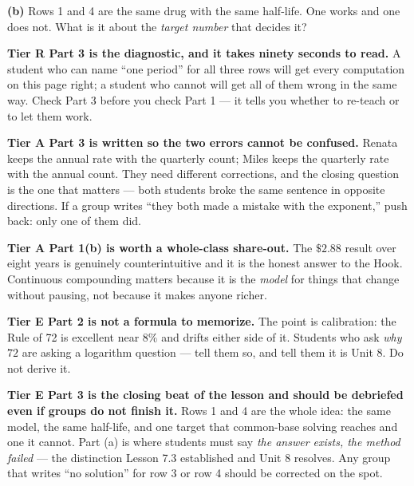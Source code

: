 \documentclass[10pt]{article}
\begin{document}
\begin{tcolorbox}[colback=white, colframe=black!40, title=\textbf{Tier E --- Extension},
    fonttitle=\bfseries, arc=1.5mm, left=3mm, right=3mm, top=2mm, bottom=2mm, breakable]
\vspace{2pt}
\textbf{(b)} Rows 1 and 4 are the same drug with the same half-life. One works and one does not. What
is it about the \emph{target number} that decides it?
\end{tcolorbox}

\begin{teachernote}
\textbf{Tier R Part 3 is the diagnostic, and it takes ninety seconds to read.} A student who can name
``one period'' for all three rows will get every computation on this page right; a student who cannot
will get all of them wrong in the same way. Check Part 3 before you check Part 1 --- it tells you
whether to re-teach or to let them work.

\textbf{Tier A Part 3 is written so the two errors cannot be confused.} Renata keeps the annual rate
with the quarterly count; Miles keeps the quarterly rate with the annual count. They need different
corrections, and the closing question is the one that matters --- both students broke the same sentence
in opposite directions. If a group writes ``they both made a mistake with the exponent,'' push back:
only one of them did.

\textbf{Tier A Part 1(b) is worth a whole-class share-out.} The $\$2.88$ result over eight years is
genuinely counterintuitive and it is the honest answer to the Hook. Continuous compounding matters
because it is the \emph{model} for things that change without pausing, not because it makes anyone
richer.

\textbf{Tier E Part 2 is not a formula to memorize.} The point is calibration: the Rule of 72 is
excellent near $8\%$ and drifts either side of it. Students who ask \emph{why} $72$ are asking a
logarithm question --- tell them so, and tell them it is Unit 8. Do not derive it.

\textbf{Tier E Part 3 is the closing beat of the lesson and should be debriefed even if groups do not
finish it.} Rows 1 and 4 are the whole idea: the same model, the same half-life, and one target that
common-base solving reaches and one it cannot. Part (a) is where students must say \emph{the answer
exists, the method failed} --- the distinction Lesson 7.3 established and Unit 8 resolves. Any group
that writes ``no solution'' for row 3 or row 4 should be corrected on the spot.
\end{teachernote}
\end{document}
